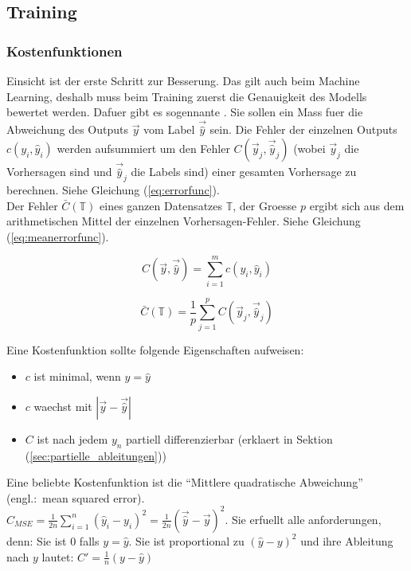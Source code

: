 \documentclass[../main]{subfiles}
\begin{document}
\subsection{Training}
\subsubsection{Kostenfunktionen}
Einsicht ist der erste Schritt zur Besserung. Das gilt auch beim Machine Learning, deshalb muss beim Training zuerst die Genauigkeit des Modells bewertet werden.
Dafuer gibt es sogennante . Sie sollen ein Mass fuer die Abweichung des Outputs $\vec{y}$ vom Label $\vec{\hat{y}}$ sein.
\para
Die Fehler der einzelnen Outputs $c(y_i,\hat{y}_i)$ werden aufsummiert um den
Fehler $C(\vec{y}_j,\vec{\hat{y}}_j)$ (wobei $\vec{y}_j$ die Vorhersagen sind und
$\vec{\hat{y}}_j$ die Labels sind) einer gesamten Vorhersage zu berechnen. Siehe Gleichung (\ref{eq:errorfunc}).\\
Der Fehler $\bar{C}(\mathbb{T})$ eines ganzen Datensatzes $\mathbb{T}$, der
Groesse $p$ ergibt sich aus dem arithmetischen
Mittel der einzelnen Vorhersagen-Fehler. Siehe Gleichung (\ref{eq:meanerrorfunc}).
\para
\begin{minipage}[h!]{0.5\textwidth}
  \centering
  \begin{equation}\label{eq:errorfunc}
    C \left(\vec{y},\vec{\hat{y}} \right)=\displaystyle\sum_{i=1}^{m} c(y_i, \hat{y}_i)
  \end{equation}
\end{minipage}
\begin{minipage}[h!]{0.5\textwidth}
  \centering
  \begin{equation}\label{eq:meanerrorfunc}
    \bar{C}(\mathbb{T}) = \frac{1}{p}\displaystyle\sum_{j=1}^{p} C\left(\vec{y}_j,\vec{\hat{y}}_j\right)
  \end{equation}
\end{minipage}
\para
Eine Kostenfunktion sollte folgende Eigenschaften aufweisen:
\begin{itemize}
\item{$c$ ist minimal, wenn $y = \hat{y}$}
\item{$c$ waechst mit $|\vec{y}-\vec{\hat{y}}|$}
\item{$C$ ist nach jedem $y_n$ partiell differenzierbar (erklaert in Sektion (\ref{sec:partielle_ableitungen}))}
\end{itemize}

Eine beliebte Kostenfunktion ist die ``Mittlere quadratische Abweichung'' (engl.:\ mean squared error).\\
$\displaystyle C_{MSE} = \frac{1}{2n}\sum_{i=1}^{n}{(\hat{y}_i - y_i)}^2 = \frac{1}{2n}{(\vec{\hat{y}} - \vec{y})}^2$.
Sie erfuellt alle anforderungen, denn:
Sie ist $0$ falls $y=\hat{y}$. Sie ist proportional zu ${(\hat{y}-y)}^2$ und ihre Ableitung nach $y$ lautet: $C'=\frac{1}{n}(y-\hat{y})$
\end{document}
